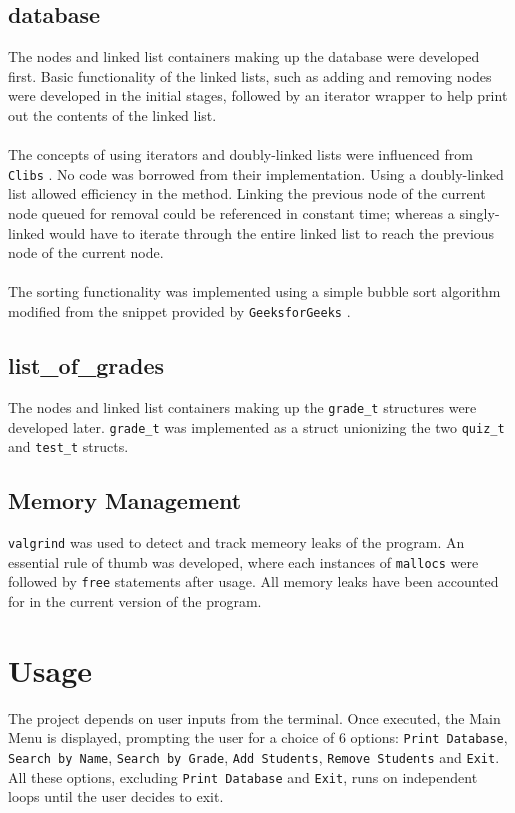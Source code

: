 \documentclass[usletter, 12pt]{article}
\begin{document}
        \subsection{database} The nodes and linked list containers making up
        the database were developed first. Basic functionality of the linked
        lists, such as adding and removing nodes were developed in the initial
        stages, followed by an iterator wrapper to help print out the contents
        of the linked list. \\~\\
        \noindent The concepts of using iterators and doubly-linked
        lists were influenced from \texttt{Clibs} \cite{clibs}. No code was
        borrowed from their implementation. Using a doubly-linked list allowed
        efficiency in the  method. Linking the previous
        node of the current node queued for removal could be referenced in
        constant time; whereas a singly-linked would have to iterate through
        the entire linked list to reach the previous node of the current node.
        \\~\\
        \noindent The sorting functionality was implemented using a simple
        bubble sort algorithm modified from the snippet provided by
        \texttt{GeeksforGeeks} \cite{gfg}.

        \subsection{list\_of\_grades} The nodes and linked list containers
        making up the \texttt{grade\_t} structures were developed later.
        \texttt{grade\_t} was implemented as a struct unionizing the two
        \texttt{quiz\_t} and \texttt{test\_t} structs.

        \subsection{Memory Management} \texttt{valgrind} was used to detect and
        track memeory leaks of the program. An essential rule of thumb was
        developed, where each instances of \texttt{mallocs} were followed by
        \texttt{free} statements after usage. All memory leaks have been
        accounted for in the current version of the program.

    \section{Usage}
    The project depends on user inputs from the terminal. Once executed, the
    Main Menu is displayed, prompting the user for a choice of 6 options:
    \texttt{Print Database}, \texttt{Search by Name}, \texttt{Search by Grade},
    \texttt{Add Students}, \texttt{Remove Students} and \texttt{Exit}. All
    these options, excluding \texttt{Print Database} and \texttt{Exit}, runs on
    independent loops until the user decides to exit.
\end{document}
